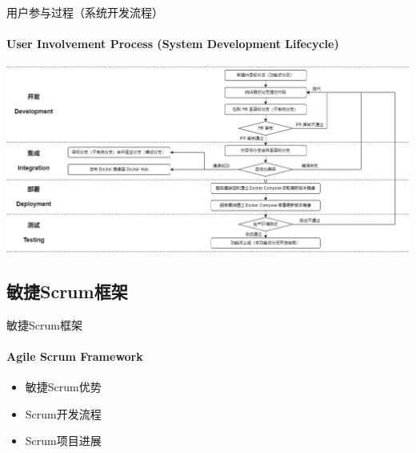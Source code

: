 \documentclass{beamer}
\begin{document}
\begin{frame}[fragile]{用户参与过程（系统开发流程）}
\framesubtitle{User Involvement Process (System Development Lifecycle)}
\includegraphics[width=\textwidth]
{figures/system_development_flowchart}
\end{frame}


\subsection{敏捷Scrum框架}

\begin{chapter}{}{敏捷Scrum框架}
\framesubtitle{Agile Scrum Framework}
\begin{itemize}
\item 敏捷Scrum优势
\item Scrum开发流程
\item Scrum项目进展
\end{itemize}
\end{chapter}

\end{document}

